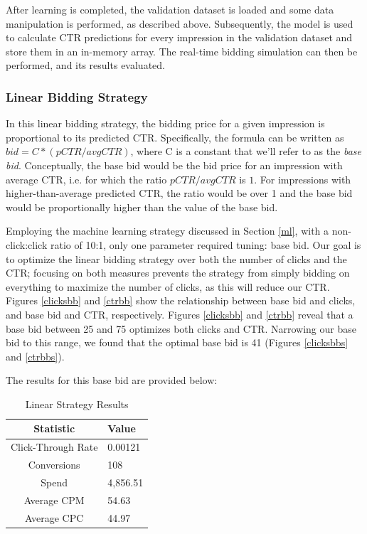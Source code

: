 \documentclass{sig-alternate-05-2015}
\begin{document}
After learning is completed, the validation dataset is loaded and some data manipulation is performed, as described above. Subsequently, the model is used to calculate CTR predictions for every impression in the validation dataset and store them in an in-memory array. The real-time bidding simulation can then be performed, and its results evaluated.

\subsubsection{Linear Bidding Strategy}

In this linear bidding strategy, the bidding price for a given impression is proportional to its predicted CTR. Specifically, the formula can be written as $bid = C * (pCTR / avg CTR) $, where C is a constant that we'll refer to as the \textit{base bid}. Conceptually, the base bid would be the bid price for an impression with average CTR, i.e. for which the ratio $pCTR / avg CTR$ is $1$. For impressions with higher-than-average predicted CTR, the ratio would be over 1 and the base bid would be proportionally higher than the value of the base bid.

Employing the machine learning strategy discussed in Section \ref{ml}, with a non-click:click ratio of 10:1, only one parameter required tuning: base bid. Our goal is to optimize the linear bidding strategy over both the number of clicks and the CTR; focusing on both measures prevents the strategy from simply bidding on everything to maximize the number of clicks, as this will reduce our CTR. Figures \ref{clicksbb} and \ref{ctrbb} show the relationship between base bid and clicks, and base bid and CTR, respectively. Figures \ref{clicksbb} and \ref{ctrbb} reveal that a base bid between 25 and 75 optimizes both clicks and CTR. Narrowing our base bid to this range, we found that the optimal base bid is 41 (Figures \ref{clicksbbs} and \ref{ctrbbs}).

The results for this base bid are provided below:

\begin{table}[h!]
\centering
\caption{Linear Strategy Results}
\begin{tabular}{|c|l|} \hline
\textbf{Statistic}&\textbf{Value}\\ \hline
Click-Through Rate&0.00121\\ \hline
Conversions&108\\ \hline
Spend&4,856.51\\ \hline
Average CPM&54.63\\ \hline
Average CPC&44.97\\
\hline\end{tabular}
\end{table}
\end{document}
